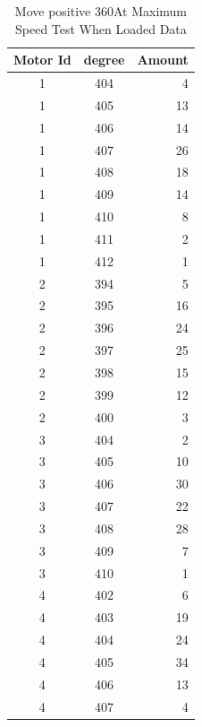 \begin{table}
	\centering
	\begin{tabular}{| c | c | r | }
 	 \hline
	 Motor Id & degree & Amount \\ \hline
	 1 & 404 & 4  \\ \hline
	 1 & 405 & 13 \\ \hline
	 1 & 406 & 14 \\ \hline
	 1 & 407 & 26 \\ \hline
	 1 & 408 & 18 \\ \hline
	 1 & 409 & 14 \\ \hline
	 1 & 410 & 8  \\ \hline
	 1 & 411 & 2  \\ \hline
	 1 & 412 & 1  \\ \hline
	 2 & 394 & 5  \\ \hline
	 2 & 395 & 16 \\ \hline
	 2 & 396 & 24 \\ \hline
	 2 & 397 & 25 \\ \hline
	 2 & 398 & 15 \\ \hline
	 2 & 399 & 12 \\ \hline
	 2 & 400 & 3  \\ \hline	 	 
	 3 & 404 & 2  \\ \hline
	 3 & 405 & 10 \\ \hline
	 3 & 406 & 30 \\ \hline
	 3 & 407 & 22 \\ \hline
	 3 & 408 & 28 \\ \hline
	 3 & 409 & 7  \\ \hline
 	 3 & 410 & 1  \\ \hline
	 4 & 402 & 6  \\ \hline
	 4 & 403 & 19 \\ \hline
	 4 & 404 & 24 \\ \hline
	 4 & 405 & 34 \\ \hline
	 4 & 406 & 13 \\ \hline
	 4 & 407 & 4  \\ \hline
	\end{tabular}
	\caption{Move positive 360\textdegree At Maximum Speed Test When Loaded Data}
	\label{tbl:cmpl_l_positive_test_data}
\end{table}

